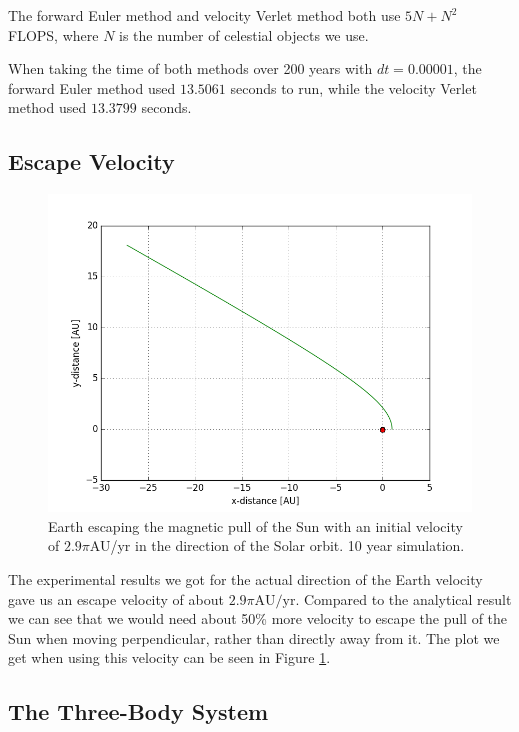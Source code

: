 \documentclass[10pt,showpacs,preprintnumbers,footinbib,amsmath,amssymb,aps,prl,twocolumn,groupedaddress,superscriptaddress,showkeys]{revtex4-1}
\begin{document}
The forward Euler method and velocity Verlet method both use $5N + N^2$ FLOPS, where $N$ is the number of celestial objects we use.

When taking the time of both methods over 200 years with $dt = 0.00001$, the forward Euler method used $13.5061$ seconds to run, while the velocity Verlet method used $13.3799$ seconds.

\subsection{Escape Velocity}
\begin{figure}
\includegraphics[width = \linewidth]{escape_velocity}
\caption{Earth escaping the magnetic pull of the Sun with an initial velocity of $2.9\pi$AU/yr in the direction of the Solar orbit. 10 year simulation.}
\label{fig:escape_velocity}
\end{figure}

The experimental results we got for the actual direction of the Earth velocity gave us an escape velocity of about $2.9\pi \mathrm{AU/yr}$. Compared to the analytical result we can see that we would need about 50\% more velocity to escape the pull of the Sun when moving perpendicular, rather than directly away from it. The plot we get when using this velocity can be seen in Figure \ref{fig:escape_velocity}.

\subsection{The Three-Body System}
\end{document}
